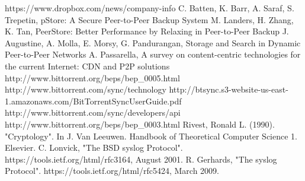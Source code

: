 \documentclass[12pt]{report}
\begin{document}
\begin{thebibliography}{11}

 https://www.dropbox.com/news/company-info
 C. Batten, K. Barr, A. Saraf, S. Trepetin, pStore: A Secure Peer-to-Peer Backup System
 M. Landers, H. Zhang, K. Tan, PeerStore: Better Performance by Relaxing in Peer-to-Peer Backup
 J. Augustine, A. Molla, E. Morsy, G. Pandurangan, Storage and Search in Dynamic Peer-to-Peer Networks
 A. Passarella, A survey on content-centric technologies for the current Internet: CDN and P2P solutions
 http://www.bittorrent.org/beps/bep\_0005.html
 http://www.bittorrent.com/sync/technology
 http://btsync.s3-website-us-east-1.amazonaws.com/BitTorrentSyncUserGuide.pdf
 http://www.bittorrent.com/sync/developers/api
 http://www.bittorrent.org/beps/bep\_0003.html
 Rivest, Ronald L. (1990). "Cryptology". In J. Van Leeuwen. Handbook of Theoretical Computer Science 1. Elsevier.
 C. Lonvick, "The BSD syslog Protocol". https://tools.ietf.org/html/rfc3164, August 2001.
 R. Gerhards, "The syslog Protocol". https://tools.ietf.org/html/rfc5424, March 2009.

\end{thebibliography}
\end{document}
